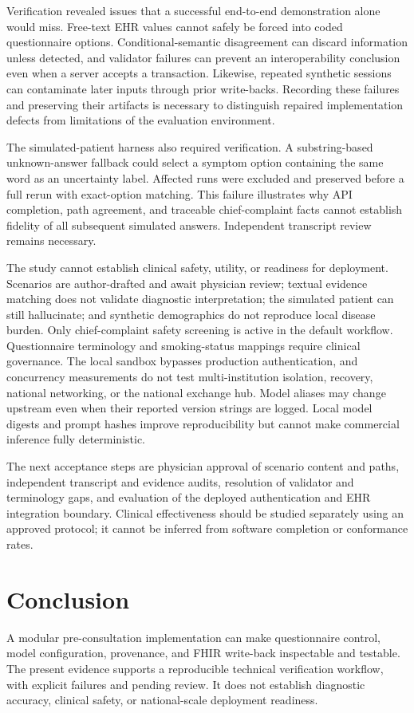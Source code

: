 Verification revealed issues that a successful end-to-end demonstration alone
would miss. Free-text EHR values cannot safely be forced into coded questionnaire
options. Conditional-semantic disagreement can discard information unless
detected, and validator failures can prevent an interoperability conclusion even
when a server accepts a transaction. Likewise, repeated synthetic sessions can
contaminate later inputs through prior write-backs. Recording these failures and
preserving their artifacts is necessary to distinguish repaired implementation
defects from limitations of the evaluation environment.

The simulated-patient harness also required verification. A substring-based
unknown-answer fallback could select a symptom option containing the same word
as an uncertainty label. Affected runs were excluded and preserved before a full
rerun with exact-option matching. This failure illustrates why API completion,
path agreement, and traceable chief-complaint facts cannot establish fidelity of
all subsequent simulated answers. Independent transcript review remains necessary.

The study cannot establish clinical safety, utility, or readiness for deployment.
Scenarios are author-drafted and await physician review; textual evidence matching
does not validate diagnostic interpretation; the simulated patient can still
hallucinate; and synthetic demographics do not reproduce local disease burden.
Only chief-complaint safety screening is active in the default workflow.
Questionnaire terminology and smoking-status mappings require clinical governance.
The local sandbox bypasses production authentication, and concurrency measurements
do not test multi-institution isolation, recovery, national networking, or the
national exchange hub. Model aliases may change upstream even when their reported
version strings are logged. Local model digests and prompt hashes improve
reproducibility but cannot make commercial inference fully deterministic.

The next acceptance steps are physician approval of scenario content and paths,
independent transcript and evidence audits, resolution of validator and terminology
gaps, and evaluation of the deployed authentication and EHR integration boundary.
Clinical effectiveness should be studied separately using an approved protocol;
it cannot be inferred from software completion or conformance rates.

\section{Conclusion}\label{sec:conclusion}
A modular pre-consultation implementation can make questionnaire control,
model configuration, provenance, and FHIR write-back inspectable and testable.
The present evidence supports a reproducible technical verification workflow,
with explicit failures and pending review. It does not establish diagnostic
accuracy, clinical safety, or national-scale deployment readiness.

